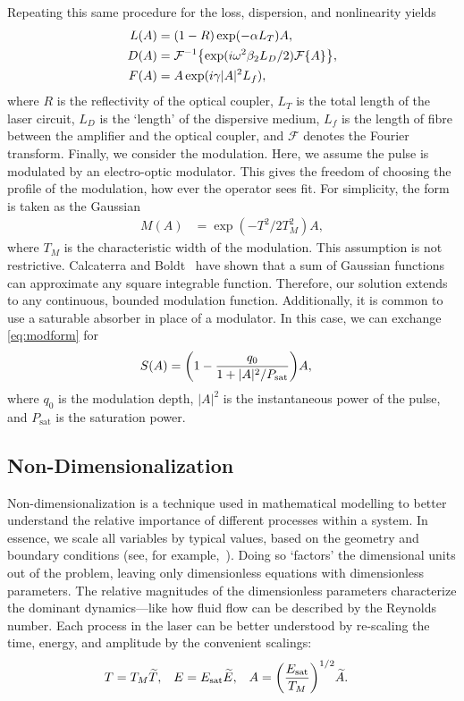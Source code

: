 \documentclass[9pt,twocolumn,twoside]{osajnl}
\let\originalleft\left
\let\originalright\right
\renewcommand{\left}{\mathopen{}\mathclose\bgroup\originalleft}
\renewcommand{\right}{\aftergroup\egroup\originalright}
\newcommand{\Es}{E_{\textrm{sat}}} %
\newcommand{\FT}[1]{\mathcal{F}\left\{ #1 \right\}} %
\newcommand{\FTi}[1]{\mathcal{F}^{-1}\left\{ #1 \right\}} %
\begin{document}
Repeating this same procedure for the loss, dispersion, and nonlinearity yields
\begin{align}
	L(A) &= (1 - R) \exp( - \alpha L_T )A, \\
	D(A) &= \FTi{\exp( i \omega^2 \beta_2 L_D/2 ) \FT{A}}, \\
	F(A) &= A \exp( i \gamma |A|^2 L_f ),
\end{align}
where $R$ is the reflectivity of the optical coupler, $L_T$ is the total length of the laser circuit, $L_D$ is the `length' of the dispersive medium, $L_f$ is the length of fibre between the amplifier and the optical coupler, and $\mathcal{F}$ denotes the Fourier transform. Finally, we consider the modulation. Here, we assume the pulse is modulated by an electro-optic modulator. This gives the freedom of choosing the profile of the modulation, how ever the operator sees fit. For simplicity, the form is taken as the Gaussian
\begin{align}
	M(A) &= \exp( -T^2 / 2 T_M^2 ) A,
	\label{eq:modform}
\end{align}
where $T_M$ is the characteristic width of the modulation. This assumption is not restrictive. Calcaterra and Boldt~\cite{calcaterra2008a} have shown that a sum of Gaussian functions can approximate any square integrable function. Therefore, our solution extends to any continuous, bounded modulation function. Additionally, it is common to use a saturable absorber in place of a modulator. In this case, we can exchange \eqref{eq:modform} for~\cite{lapre2019, meng2020, oktem2010, woodward2018}
\begin{align}
	S(A) &= \left( 1 - \frac{q_0}{1 + |A|^2 / P_\text{sat}} \right) A,
\end{align}
where $q_0$ is the modulation depth, $|A|^2$ is the instantaneous power of the pulse, and $P_\text{sat}$ is the saturation power.

\subsection{Non-Dimensionalization}
Non-dimensionalization is a technique used in mathematical modelling to better understand the relative importance of different processes within a system. In essence, we scale all variables by typical values, based on the geometry and boundary conditions (see, for example,~\cite{howison2005}). Doing so `factors' the dimensional units out of the problem, leaving only dimensionless equations with dimensionless parameters. The relative magnitudes of the dimensionless parameters characterize the dominant dynamics---like how fluid flow can be described by the Reynolds number. Each process in the laser can be better understood by re-scaling the time, energy, and amplitude by the convenient scalings:
\begin{align}
	T &= T_M \widetilde{T},& E &= \Es \widetilde{E},& A &= \left( \frac{\Es}{T_M} \right)^{1/2} \widetilde{A}.
\end{align}
\end{document}
